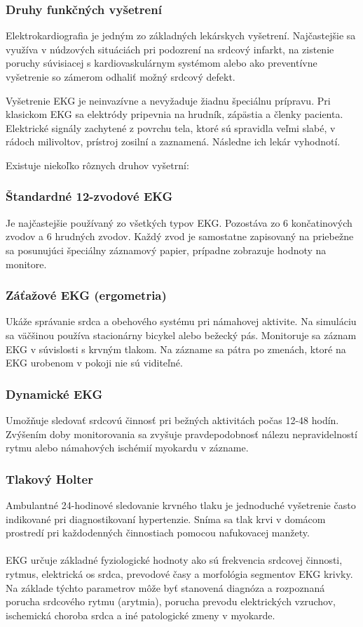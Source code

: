\documentclass[titlepage]{article}
\begin{document}
\subsubsection{Druhy funkčných vyšetrení}
Elektrokardiografia je jedným zo základných lekárskych vyšetrení. Najčastejšie sa využíva v núdzových situáciách pri podozrení na srdcový infarkt, na zistenie poruchy súvisiacej s kardiovaskulárnym systémom alebo ako preventívne vyšetrenie so zámerom odhaliť možný srdcový defekt.

Vyšetrenie EKG je neinvazívne a nevyžaduje žiadnu špeciálnu prípravu. Pri klasickom EKG sa elektródy pripevnia na hrudník, zápästia a členky pacienta. Elektrické signály zachytené z povrchu tela, ktoré sú spravidla veľmi slabé, v rádoch milivoltov, prístroj zosilní a zaznamená. Následne ich lekár vyhodnotí.

Existuje niekoľko rôznych druhov vyšetrní:
\subsubsection*{Štandardné 12-zvodové EKG}
Je najčastejšie používaný zo všetkých typov EKG. Pozostáva zo 6 končatinových zvodov a 6 hrudných zvodov. Každý zvod je samostatne zapisovaný na priebežne sa posunujúci špeciálny záznamový papier, prípadne zobrazuje hodnoty na monitore.
\subsubsection*{Záťažové EKG (ergometria)}
Ukáže správanie srdca a obehového systému pri námahovej aktivite. Na simuláciu sa väčšinou používa stacionárny bicykel alebo bežecký pás. Monitoruje sa záznam EKG v súvislosti s krvným tlakom. Na zázname sa pátra po zmenách, ktoré na EKG urobenom v pokoji nie sú viditeľné.
\subsubsection*{Dynamické EKG}
Umožňuje sledovať srdcovú činnosť pri bežných aktivitách počas 12-48 hodín. Zvýšením doby monitorovania sa zvyšuje pravdepodobnosť nálezu nepravidelností rytmu alebo námahových ischémií myokardu v zázname.
\subsubsection*{Tlakový Holter}
Ambulantné 24-hodinové sledovanie krvného tlaku je jednoduché vyšetrenie často indikované pri diagnostikovaní hypertenzie. Sníma sa tlak krvi v domácom prostredí pri každodenných činnostiach pomocou nafukovacej manžety.
\\
\\
EKG určuje základné fyziologické hodnoty ako sú frekvencia srdcovej činnosti, rytmus, elektrická os srdca, prevodové časy a morfológia segmentov EKG krivky. Na základe týchto parametrov môže byť stanovená diagnóza a rozpoznaná porucha srdcového rytmu (arytmia), porucha prevodu elektrických vzruchov, ischemická choroba srdca a iné patologické zmeny v myokarde.
\end{document}
